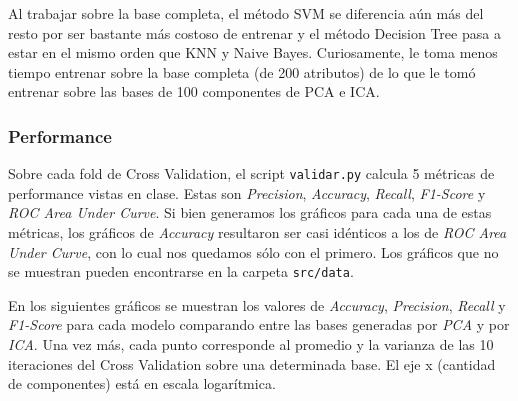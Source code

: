 \documentclass[10pt, a4paper]{article}
\begin{document}
Al trabajar sobre la base completa, el método SVM se diferencia aún más del resto por ser bastante más costoso de entrenar y el método Decision Tree pasa a estar en el mismo orden que KNN y Naive Bayes. Curiosamente, le toma menos tiempo entrenar sobre la base completa (de 200 atributos) de lo que le tomó entrenar sobre las bases de 100 componentes de PCA e ICA.

\subsubsection{Performance}

Sobre cada fold de Cross Validation, el script \texttt{validar.py} calcula 5 métricas de performance vistas en clase. Estas son \textit{Precision}, \textit{Accuracy}, \textit{Recall}, \textit{F1-Score} y \textit{ROC Area Under Curve}. Si bien generamos los gráficos para cada una de estas métricas, los gráficos de \textit{Accuracy} resultaron ser casi idénticos a los de \textit{ROC Area Under Curve}, con lo cual nos quedamos sólo con el primero. Los gráficos que no se muestran pueden encontrarse en la carpeta \texttt{src/data}.

En los siguientes gráficos se muestran los valores de \textit{Accuracy}, \textit{Precision}, \textit{Recall} y \textit{F1-Score} para cada modelo comparando entre las bases generadas por \textit{PCA} y por \textit{ICA}. Una vez más, cada punto corresponde al promedio y la varianza de las 10 iteraciones del Cross Validation sobre una determinada base. El eje x (cantidad de componentes) está en escala logarítmica.
\end{document}
